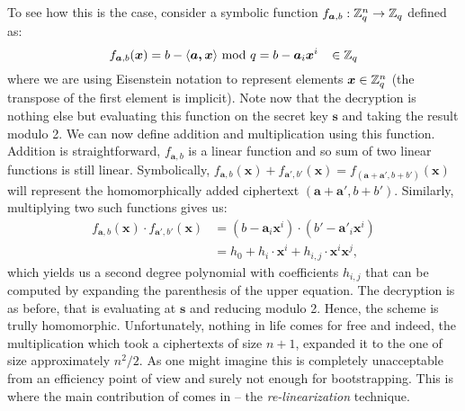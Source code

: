 To see how this is the case, consider a symbolic function $f_{\boldsymbol{a},b} : \mathbb{Z}_q^n \rightarrow \mathbb{Z}_q$ defined as:
\[f_{\boldsymbol{a}, b}(\boldsymbol{x}) = b - \langle \boldsymbol{a, x} \rangle \text{ mod } q = b - \boldsymbol{a}_i \boldsymbol{x}^i \; \; \; \in \mathbb{Z}_q \]
where we are using Eisenstein notation to represent elements $\boldsymbol{x} \in \mathbb{Z}_q^n$ (the transpose of the first element is implicit). Note now that the decryption is nothing else but evaluating this function on the secret key $\bm{s}$ and taking the result modulo 2. We can now define addition and multiplication using this function. Addition is straightforward, $f_{\bm{a}, b}$ is a linear function and so sum of two linear functions is still linear. Symbolically, $f_{\bm{a},b}(\bm{x}) + f_{\bm{a}',b'}(\bm{x}) = f_{(\bm{a}+\bm{a}',b+b')}(\bm{x})$ will represent the homomorphically added ciphertext $(\bm{a}+\bm{a}',b+b')$. Similarly, multiplying two such functions gives us:
\begin{equation}\label{mult}
  \begin{split}
  f_{\bm{a},b}(\bm{x}) \cdot f_{\bm{a}',b'}(\bm{x}) & = ( b - \bm{a}_i \bm{x}^i) \cdot ( b' - \bm{a}'_i \bm{x}^i ) \\
						    & = h_0 + h_i \cdot \bm{x}^i + h_{i,j} \cdot \bm{x}^i \bm{x}^j,
\end{split}
\end{equation}
which yields us a second degree polynomial with coefficients $h_{i,j}$ that can be computed by expanding the parenthesis of the upper equation. The decryption is as before, that is evaluating at $\bm{s}$ and reducing modulo 2. Hence, the scheme is trully homomorphic. Unfortunately, nothing in life comes for free and indeed, the multiplication which took a ciphertexts of size $n+1$, expanded it to the one of size approximately $n^2/2$. As one might imagine this is completely unacceptable from an efficiency point of view and surely not enough for bootstrapping. This is where the main contribution of \cite{fhe-lwe} comes in -- the \textit{re-linearization} technique.
